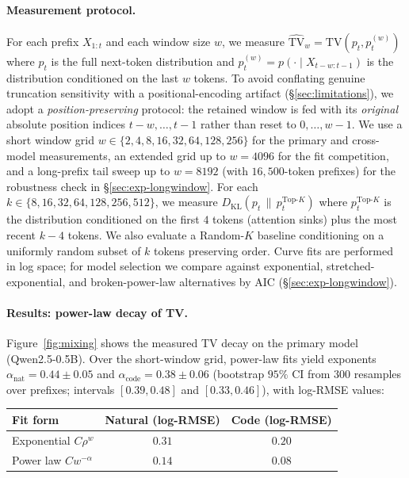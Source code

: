 \documentclass[11pt]{article}
\newcommand{\KL}[2]{D_{\mathrm{KL}}(#1 \,\|\, #2)}
\newcommand{\TV}{\mathrm{TV}}
\theoremstyle{plain}
\theoremstyle{definition}
\theoremstyle{remark}
\begin{document}
\paragraph{Measurement protocol.}
For each prefix $X_{1:t}$ and each window size $w$, we measure
$\widehat{\TV}_w = \TV(p_t, p_t^{(w)})$ where $p_t$ is the full
next-token distribution and $p_t^{(w)} = p(\cdot \mid X_{t-w:t-1})$
is the distribution conditioned on the last $w$ tokens. To avoid
conflating genuine truncation sensitivity with a positional-encoding
artifact (\S\ref{sec:limitations}), we adopt a
\emph{position-preserving} protocol: the retained window is fed with
its \emph{original} absolute position indices $t-w, \ldots, t-1$
rather than reset to $0, \ldots, w-1$. We use a short window grid
$w \in \{2, 4, 8, 16, 32, 64, 128, 256\}$ for the primary and
cross-model measurements, an extended grid up to $w = 4096$ for the
fit competition, and a long-prefix tail sweep up to $w = 8192$
(with $16{,}500$-token prefixes) for the robustness check in
\S\ref{sec:exp-longwindow}. For
each $k \in \{8, 16, 32, 64, 128, 256, 512\}$, we measure
$\KL{p_t}{p_t^{\text{Top-}K}}$ where $p_t^{\text{Top-}K}$ is the
distribution conditioned on the first $4$ tokens (attention sinks)
plus the most recent $k - 4$ tokens. We also evaluate a Random-$K$
baseline conditioning on a uniformly random subset of $k$ tokens
preserving order. Curve fits are performed in log space; for model
selection we compare against exponential, stretched-exponential, and
broken-power-law alternatives by AIC (\S\ref{sec:exp-longwindow}).

\paragraph{Results: power-law decay of TV.}
Figure~\ref{fig:mixing} shows the measured TV decay on the primary
model (Qwen2.5-0.5B). Over the short-window grid, power-law fits
yield exponents $\alpha_{\text{nat}} = 0.44 \pm 0.05$ and
$\alpha_{\text{code}} = 0.38 \pm 0.06$ (bootstrap $95\%$ CI from
$300$ resamples over prefixes; intervals
$[0.39, 0.48]$ and $[0.33, 0.46]$), with log-RMSE values:

\begin{center}
\small
\setlength{\tabcolsep}{4pt}
\begin{tabular}{lcc}
\toprule
Fit form & Natural (log-RMSE) & Code (log-RMSE) \\
\midrule
Exponential $C\rho^w$ & $0.31$ & $0.20$ \\
Power law $C w^{-\alpha}$ & $\mathbf{0.14}$ & $\mathbf{0.08}$ \\
\bottomrule
\end{tabular}
\end{center}
\end{document}
